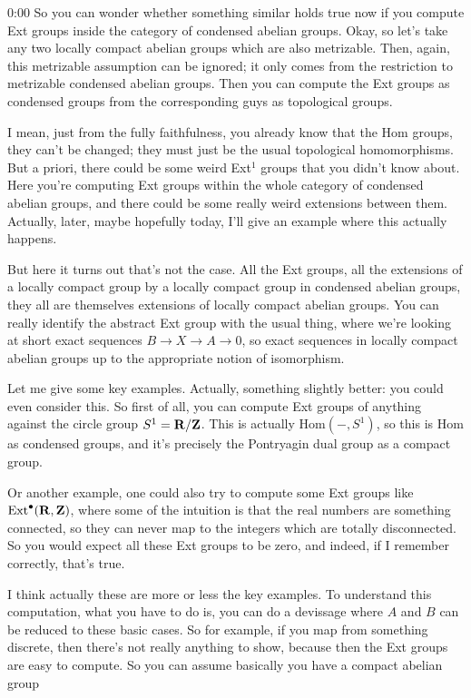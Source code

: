 \begin{unfinished}{0:00}
So you can wonder whether something similar holds true now if you compute Ext groups inside the category of condensed abelian groups. Okay, so let's take any two locally compact abelian groups which are also metrizable. Then, again, this metrizable assumption can be ignored; it only comes from the restriction to metrizable condensed abelian groups. Then you can compute the Ext groups as condensed groups from the corresponding guys as topological groups.

I mean, just from the fully faithfulness, you already know that the Hom groups, they can't be changed; they must just be the usual topological homomorphisms. But a priori, there could be some weird Ext$^1$ groups that you didn't know about. Here you're computing Ext groups within the whole category of condensed abelian groups, and there could be some really weird extensions between them. Actually, later, maybe hopefully today, I'll give an example where this actually happens.

But here it turns out that's not the case. All the Ext groups, all the extensions of a locally compact group by a locally compact group in condensed abelian groups, they all are themselves extensions of locally compact abelian groups. You can really identify the abstract Ext group with the usual thing, where we're looking at short exact sequences $B\to X\to A\to 0$, so exact sequences in locally compact abelian groups up to the appropriate notion of isomorphism.

Let me give some key examples. Actually, something slightly better: you could even consider this. So first of all, you can compute Ext groups of anything against the circle group $S^1=\mathbf R/\mathbf Z$. This is actually $\mathrm{Hom}(-,S^1)$, so this is $\mathrm{Hom}$ as condensed groups, and it's precisely the Pontryagin dual group as a compact group.

Or another example, one could also try to compute some Ext groups like $\operatorname{Ext}^{\bullet}(\mathbf R,\mathbf Z)$, where some of the intuition is that the real numbers are something connected, so they can never map to the integers which are totally disconnected. So you would expect all these Ext groups to be zero, and indeed, if I remember correctly, that's true.

I think actually these are more or less the key examples. To understand this computation, what you have to do is, you can do a devissage where $A$ and $B$ can be reduced to these basic cases. So for example, if you map from something discrete, then there's not really anything to show, because then the Ext groups are easy to compute. So you can assume basically you have a compact abelian group


\end{unfinished}

